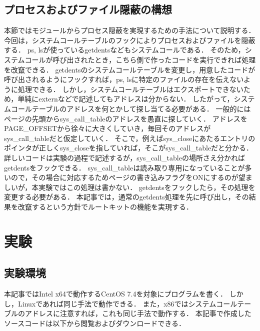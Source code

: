 \documentclass{jsarticle}
\begin{document}
  \subsection{プロセスおよびファイル隠蔽の構想}
  本節ではモジュールからプロセス隠蔽を実現するための手法について説明する．
  今回は，システムコールテーブルのフックによりプロセスおよびファイルを隠蔽する．
  ps, lsが使っているgetdentsなどもシステムコールである．
  そのため，システムコールが呼び出されたとき，こちら側で作ったコードを実行できれば処理を改竄できる．
  getdentsのシステムコールテーブルを変更し，用意したコードが呼び出されるようにフックすれば，ps, lsに特定のファイルの存在を伝えないように処理できる．
  しかし，システムコールテーブルはエクスポートできないため，単純にexternなどで記述してもアドレスは分からない．
  したがって，システムコールテーブルのアドレスを何とかして探し当てる必要がある．
  一般的にはページの先頭からsys\_call\_tableのアドレスを愚直に探していく．
  アドレスをPAGE\_OFFSETから徐々に大きくしていき，毎回そのアドレスがsys\_call\_tableだと仮定していく．
  そこで，例えばsys\_closeにあたるエントリのポインタが正しくsys\_closeを指していれば，そこがsys\_call\_tableだと分かる．
  詳しいコードは実験の過程で記述するが，sys\_call\_tableの場所さえ分かればgetdentsをフックできる．
  sys\_call\_tableは読み取り専用になっていることが多いので，その場合に対応するためページの書き込みフラグをONにするのが望ましいが，本実験ではこの処理は書かない．
  getdentsをフックしたら，その処理を変更する必要がある．
  本記事では，通常のgetdents処理を先に呼び出し，その結果を改竄するという方針でルートキットの機能を実現する．
  
\newpage

\section{実験}
  \subsection{実験環境}
  本記事ではIntel x64で動作するCentOS 7.4を対象にプログラムを書く．
  しかし，Linuxであれば同じ手法で動作できる．
  また，x86ではシステムコールテーブルのアドレスに注意すれば，これも同じ手法で動作する．
  本記事で作成したソースコードは以下から閲覧およびダウンロードできる．
  
  
\end{document}
